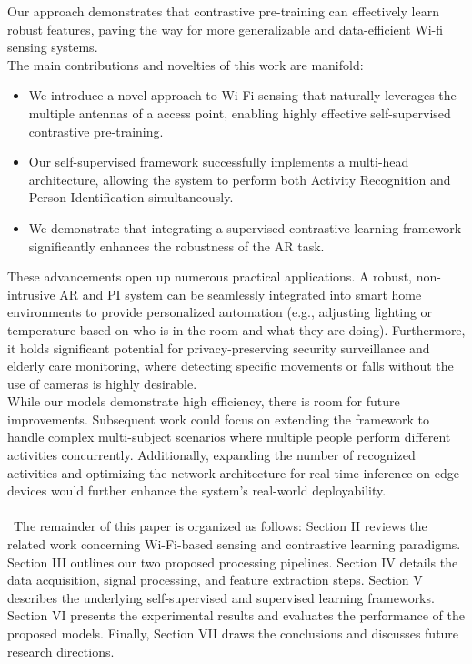 Our approach demonstrates that contrastive pre-training can effectively learn robust features, paving the way for more generalizable and data-efficient Wi-fi sensing systems.
\\
The main contributions and novelties of this work are manifold:
\begin{itemize}
\item
We introduce a novel approach to Wi-Fi sensing that naturally leverages the multiple antennas of a access point, enabling highly effective self-supervised contrastive pre-training.
\item
Our self-supervised framework successfully implements a multi-head architecture, allowing the system to perform both Activity Recognition and Person Identification simultaneously.
\item
We demonstrate that integrating a supervised contrastive learning framework significantly enhances the robustness of the AR task.
\end{itemize}
These advancements open up numerous practical applications. A robust, non-intrusive AR and PI system can be seamlessly integrated into smart home environments to provide personalized automation (e.g., adjusting lighting or temperature based on who is in the room and what they are doing). Furthermore, it holds significant potential for privacy-preserving security surveillance and elderly care monitoring, where detecting specific movements or falls without the use of cameras is highly desirable.
\\
While our models demonstrate high efficiency, there is room for future improvements. Subsequent work could focus on extending the framework to handle complex multi-subject scenarios where multiple people perform different activities concurrently. Additionally, expanding the number of recognized activities and optimizing the network architecture for real-time inference on edge devices would further enhance the system's real-world deployability.
\\\\\
The remainder of this paper is organized as follows: Section II reviews the related work concerning Wi-Fi-based sensing and contrastive learning paradigms. Section III outlines our two proposed processing pipelines. Section IV details the data acquisition, signal processing, and feature extraction steps. Section V describes the underlying self-supervised and supervised learning frameworks. Section VI presents the experimental results and evaluates the performance of the proposed models. Finally, Section VII draws the conclusions and discusses future research directions.
